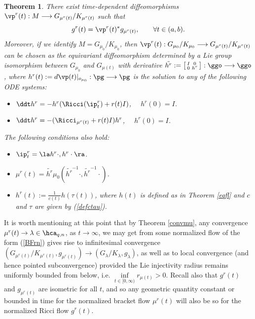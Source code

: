 \documentclass[11pt]{amsart}
\theoremstyle{plain}
\newtheorem{theorem}{Theorem}[section]
\theoremstyle{definition}
\theoremstyle{remark}
\begin{document}
\begin{theorem}\label{eqflrn}
There exist time-dependent diffeomorphisms $\vp^r(t):M\longrightarrow G_{\mu^r(t)}/K_{\mu^r(t)}$ such that
$$
g^r(t)=\vp^r(t)^*g_{\mu^r(t)}, \qquad\forall t\in (a,b).
$$
Moreover, if we identify $M=G_{\mu_0}/K_{\mu_0}$, then $\vp^r(t):G_{\mu_0}/K_{\mu_0}\longrightarrow G_{\mu^r(t)}/K_{\mu^r(t)}$ can be chosen as the equivariant diffeomorphism determined by a Lie group isomorphism between $G_{\mu_0}$ and $G_{\mu(t)}$ with derivative $\tilde{h^r}:=\left[\begin{smallmatrix} I&0\\ 0&h^r \end{smallmatrix}\right]:\ggo\longrightarrow\ggo$, where $h^r(t):=d\vp(t)|_{o_{\mu_0}}:\pg\longrightarrow\pg$ is the solution to any of the following ODE systems:

\begin{itemize}
\item[(i)] $\ddt h^r=-h^r(\Ricci(\ip^r_t)+r(t)I)$, $\quad h^r(0)=I$.

\item[(ii)] $\ddt h^r=-(\Ricci_{\mu^r(t)}+r(t)I)h^r$, $\quad h^r(0)=I$.
\end{itemize}
The following conditions also hold:
\begin{itemize}
\item[(iii)] $\ip^r_t=\la h^r\cdot,h^r\cdot\ra$.

\item[(iv)] $\mu^r(t)=\tilde{h^r}\mu_0(\tilde{h^r}^{-1}\cdot,\tilde{h^r}^{-1}\cdot)$.

\item[(v)] $h^r(t):= \frac{1}{c(t)} h(\tau(t))$, where $h(t)$ is defined as in {\rm Theorem \ref{eqfl}} and $c$ and $\tau$ are given by {\rm (\ref{defctau})}.
\end{itemize}
\end{theorem}


It is worth mentioning at this point that by Theorem \ref{convmu}, any convergence $\mu^r(t)\to\lambda\in\hca_{q,n}$, as $t\to\infty$, we may get from some normalized flow of the form (\ref{BFrn}) gives rise to infinitesimal convergence $\left(G_{\mu^r(t)}/K_{\mu^r(t)},g_{\mu^r(t)}\right)\to\left(G_{\lambda}/K_{\lambda},g_{\lambda}\right)$, as well as to local convergence (and hence pointed subconvergence) provided the Lie injectivity radius remains uniformly bounded from below, i.e. $\inf\limits_{t\in[0,\infty)} r_{\mu(t)}>0$.  Recall also that $g^r(t)$ and $g_{\mu^r(t)}$ are isometric for all $t$, and so any geometric quantity constant or bounded in time for the normalized bracket flow $\mu^r(t)$ will also be so for the normalized Ricci flow $g^r(t)$.
\end{document}
